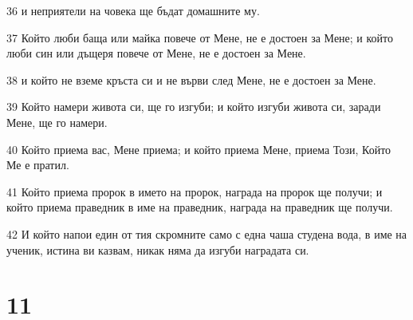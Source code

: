 \par 36 и неприятели на човека ще бъдат домашните му.
\par 37 Който люби баща или майка повече от Мене, не е достоен за Мене; и който люби син или дъщеря повече от Мене, не е достоен за Мене.
\par 38 и който не вземе кръста си и не върви след Мене, не е достоен за Мене.
\par 39 Който намери живота си, ще го изгуби; и който изгуби живота си, заради Мене, ще го намери.
\par 40 Който приема вас, Мене приема; и който приема Мене, приема Този, Който Ме е пратил.
\par 41 Който приема пророк в името на пророк, награда на пророк ще получи; и който приема праведник в име на праведник, награда на праведник ще получи.
\par 42 И който напои един от тия скромните само с една чаша студена вода, в име на ученик, истина ви казвам, никак няма да изгуби наградата си.

\chapter{11}

